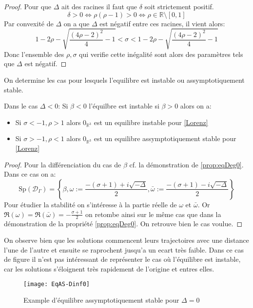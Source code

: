 \documentclass{article}
\newcommand{\R}{\mathbb{R}}
\newtheorem[M , nocut]{prop}{Proposition}[section]
\newtheorem[M]{propt}{Propriété}[section]
\newtheorem[L , nocut]{thm}{Théoreme}
\newtheorem[L]{cor}{Corollaire}
\begin{document}
\begin{proof}
    Pour que $\Delta$ ait des racines il faut que $\delta$ soit strictement positif.
    \[
    \delta > 0 \Leftrightarrow \rho(\rho-1) > 0 \Leftrightarrow \rho \in \R \setminus [0,1]
    \]Par convexité de $\Delta$ on a que $\Delta$ est négatif entre ces racines, il vient alors:
    \[
        1-2 \rho - \sqrt{ \frac{(4\rho-2)^2}{4} -1 } < \sigma < 1-2 \rho - \sqrt{ \frac{(4\rho-2)^2}{4} -1 }
    \]Donc l'ensemble des $\rho,\sigma$ qui verifie cette inégalité sont alors des paramètres tels que $\Delta$ est négatif.
\end{proof}
On determine les cas pour lesquels l'equilibre est instable ou assymptotiquement stable.
\begin{prop}
    Dans le cas $\Delta<0$:
    Si $\beta <0$ l'équilbre est instable si $\beta>0$ alors on a:
    \begin{itemize}
        \item Si $\sigma < -1 , \rho > 1$ alors $0_{\R^3}$ est un equilibre instable pour \eqref{Lorenz}
        \item Si $\sigma > -1 , \rho < 1$ alors $0_{\R^3}$ est un equilibre assymptotiquement stable pour \eqref{Lorenz}
    \end{itemize}
\end{prop}
\begin{proof}
    Pour la différenciation du cas de $\beta$ cf. la démonstration de \ref{prop:eqDeg0}. Dans ce cas on a:
    \[
        \mathrm{Sp}(\mathcal{D}_\Gamma) = \left\{\beta, \omega := \frac{-(\sigma+1)+ i \sqrt{-\Delta}}{2}, \bar{\omega} := \frac{-(\sigma+1)- i \sqrt{-\Delta}}{2}\right\}
    \]Pour étudier la stabilité on s'intéresse à la partie réelle de $\omega$ et $\bar{\omega}$. Or $\Re (\omega) = \Re (\bar{\omega}) = -\frac{\sigma+1}{2}$ on retombe ainsi sur le même cas que dans la démonstration de la propriété \ref{prop:eqDeg0}. On retrouve bien le cas voulue.
\end{proof}
\begin{example}
    On observe bien que les solutions commencent leurs trajectoires avec une distance l'une de l'autre et ensuite se raprochent jusqu'a un ecart très faible. Dans ce cas de figure il n'est pas intéressant de représenter le cas où l'équilibre est instable, car les solutions s'éloignent très rapidement de l'origine et entres elles.
    
    \begin{figure}[ht]
        \centering
        \texttt{[image: EqAS-Dinf0]}
        \caption{Example d'équilibre assymptotiquement stable pour $\Delta=0$}
    \end{figure}
\end{example}
\end{document}
